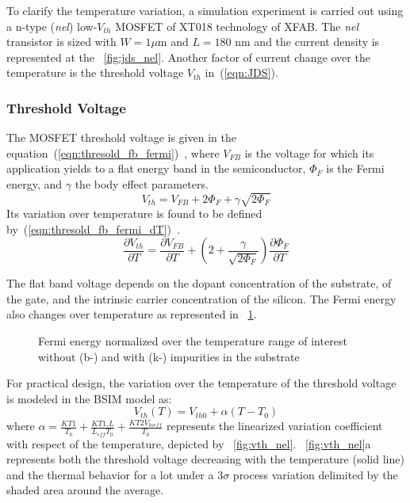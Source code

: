 To clarify the temperature variation, a simulation experiment is carried out using a n-type (\emph{nel}) low-\(V_{th}\) MOSFET of XT018 technology of XFAB\@. The \emph{nel} transistor is sized with \(W = 1 \mu \)m and \(L=180\) nm and the current density is represented at the \figurename~\ref{fig:jds_nel}. Another factor of current change over the temperature is the threshold voltage \(V_{th} \) in~(\ref{eqn:JDS}).

\subsubsection{Threshold Voltage}      %
\label{sec:threshold}
The MOSFET threshold voltage is given in the equation~(\ref{eqn:thresold_fb_fermi})~\cite{Sze2006}, where \(V_{FB} \) is the voltage for which its application yields to a flat energy band in the semiconductor, \(\Phi_F \) is the Fermi energy, and \(\gamma \) the body effect parameters.
\begin{equation}
\label{eqn:thresold_fb_fermi}
V_{th} = V_{FB} + 2 \Phi_F + \gamma \sqrt{2 \Phi_F}
\end{equation}
Its variation over temperature is found to be defined by~(\ref{eqn:thresold_fb_fermi_dT})~\cite{Filanovsky2001}. 
\begin{equation}
\label{eqn:thresold_fb_fermi_dT}
\frac{\partial V_{th}}{\partial T} = \frac{\partial V_{FB}}{\partial T} + \left( 2  + \frac{\gamma}{\sqrt{2 \Phi_F}} \right) \frac{\partial \Phi_F}{\partial T}
\end{equation}

The flat band voltage depends on the dopant concentration of the substrate, of the gate, and the intrinsic carrier concentration of the silicon. The Fermi energy also changes over temperature as represented in \figurename~\ref{fig:electron_fermi_si}.

\begin{figure}[!ht]
	\centering
	\resizebox{0.5\textwidth}{!} {
		
	}
	\caption{Fermi energy normalized over the temperature range of interest without (b-) and with (k-) impurities in the substrate}
	\label{fig:electron_fermi_si}
\end{figure}

For practical design, the variation over the temperature of the threshold voltage is modeled in the BSIM model as:
\begin{equation}
V_{th}(T) = V_{th0} + \alpha (T - T_0)
\end{equation}
where \(\alpha = \frac{KT1}{T_0}+\frac{KT1.L}{L_{eff} T_0}+\frac{KT2 V_{bseff}}{T_0}\) represents the linearized variation coefficient with respect of the temperature, depicted by \figurename~\ref{fig:vth_nel}. \figurename~\ref{fig:vth_nel}a represents both the threshold voltage decreasing with the temperature (solid line) and the thermal behavior for a lot under a 3\(\sigma \) process variation delimited by the shaded area around the average. 

